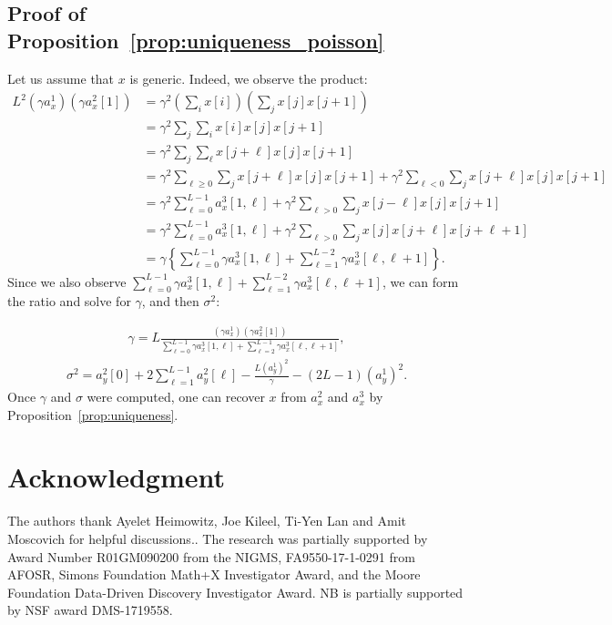 \documentclass[12pt]{article}
\newcommand{\1}{\mathbf{1}}
\newcommand{\TODO}[1]{{\color{red}{[#1]}}}
\theoremstyle{plain}
\theoremstyle{definition}
\theoremstyle{remark}
\theoremstyle{plain}
\theoremstyle{remark}
\theoremstyle{plain}
\theoremstyle{plain}
\theoremstyle{plain}
\numberwithin{equation}{section}
\begin{document}
\subsection{Proof of Proposition~\ref{prop:uniqueness_poisson}} \label{sec:proof_uniqueness_poisson}
	Let us assume that $x$ is generic. Indeed, we observe the product:
	\begin{align}
	L^2(\gamma a_x^1) (\gamma a_x^2[1])
	&= \gamma^2\left( \sum_{i} x[i] \right) \left(\sum_{j} x[j]x[j+1] \right)
	\nonumber \\
	&= \gamma^2\sum_{j} \sum_{i} x[i]x[j]x[j+1]
	\nonumber \\
	&=  \gamma^2\sum_{j} \sum_{\ell} x[j+\ell]x[j]x[j+1]
	\nonumber \\
	&=  \gamma^2\sum_{\ell \ge 0} \sum_{j} x[j+\ell]x[j]x[j+1] 
	+ \gamma^2\sum_{\ell < 0} \sum_{j} x[j+\ell]x[j]x[j+1]
	\nonumber \\
	&=  \gamma^2\sum_{\ell=0}^{L-1} a_x^3[1,\ell] 
	+ \gamma^2\sum_{\ell > 0} \sum_{j} x[j-\ell]x[j]x[j+1]
	\nonumber \\
	&=  \gamma^2\sum_{\ell=0}^{L-1} a_x^3[1,\ell] 
	+ \gamma^2\sum_{\ell > 0} \sum_{j} x[j]x[j+\ell]x[j+\ell+1]
	\nonumber \\
	&= \gamma\left\{ \sum_{\ell=0}^{L-1} \gamma a_x^3[1,\ell]
	+ \sum_{\ell=1}^{L-2} \gamma a_x^3[\ell,\ell+1]  \right\}.
	\end{align}
	Since we also observe $\sum_{\ell=0}^{L-1} \gamma a_x^3[1,\ell] + \sum_{\ell=1}^{L-2} \gamma a_x^3[\ell,\ell+1]$, we can form the ratio and solve for $\gamma$, and then $\sigma^2$:
	
	\begin{align}
	\gamma = L \frac{(\gamma a_x^1) (\gamma a_x^2[1])}
	{\sum_{\ell=0}^{L-1} \gamma a_x^3[1,\ell] 
		+ \sum_{\ell=2}^{L-1} \gamma a_x^3[\ell,\ell+1]},
	\end{align}
	\begin{align}
	\sigma^2 = a_y^2[0] + 2\sum_{\ell = 1}^{L-1}a_y^2[\ell]-\frac{L (a^1_y)^2}{\gamma}
	- (2 L - 1) (a_y^1)^2.
	\end{align}
Once $\gamma$ and $\sigma$ were computed, one can recover $x$ from $a_x^2$ and $a_x^3$  by Proposition~\ref{prop:uniqueness}.

\section*{Acknowledgment} \TODO{To check}
The authors  thank Ayelet Heimowitz, Joe Kileel, Ti-Yen Lan and Amit Moscovich  for helpful discussions..
The research was partially supported by Award Number R01GM090200 from the NIGMS, FA9550-17-1-0291 from AFOSR, Simons Foundation Math+X Investigator Award, and the Moore Foundation Data-Driven Discovery Investigator Award.
NB is partially supported by NSF award DMS-1719558.



\end{document}
